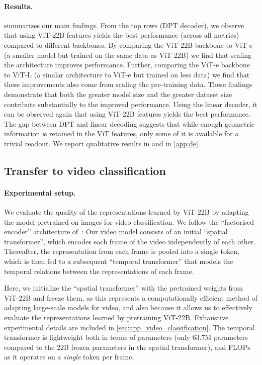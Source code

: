 \documentclass{article}
\newcommand{\chonk}{\mbox{ViT-22B}\xspace}
\begin{document}
\paragraph{Results.}
 summarizes our main findings.
From the top rows (DPT decoder), we observe that using \chonk features yields the best performance (across all metrics) compared to different backbones. By comparing the \chonk backbone to ViT-e (a smaller model but trained on the same data as \chonk) we find that scaling the architecture improves performance. Further, comparing the ViT-e backbone to ViT-L (a similar architecture to ViT-e but trained on less data) we find that these improvements also come from scaling the pre-training data. These findings demonstrate that both the greater model size and the greater dataset size contribute substantially to the improved performance.
Using the linear decoder, it can be observed again that using \chonk features yields the best performance.
The gap between DPT and linear decoding suggests that while enough geometric information is retained in the ViT features, only some of it is available for a trivial readout.
We report qualitative results in  and  in \cref{app:de}.

\subsection{Transfer to video classification}
\paragraph{Experimental setup.}
We evaluate the quality of the representations learned by \chonk by adapting the model pretrained on images for video classification.
We follow the ``factorised encoder'' architecture of~\citet{arnab2021vivit}: Our video model consists of an initial ``spatial transformer'', which encodes each frame of the video independently of each other.
Thereafter, the representation from each frame is pooled into a single token, which is then fed to a subsequent ``temporal transformer'' that models the temporal relations between the representations of each frame.

Here, we initialize the ``spatial transformer'' with the pretrained weights from ViT-22B and freeze them, as this represents a computationally efficient method of adapting large-scale models for video, and also because it allows us to effectively evaluate the representations learned by pretraining \chonk. Exhaustive experimental details are included in \cref{sec:app_video_classification}. The temporal transformer is lightweight both in terms of parameters (only 63.7M parameters compared to the 22B frozen parameters in the spatial transformer), and FLOPs as it operates on a \emph{single} token per frame.
\end{document}
